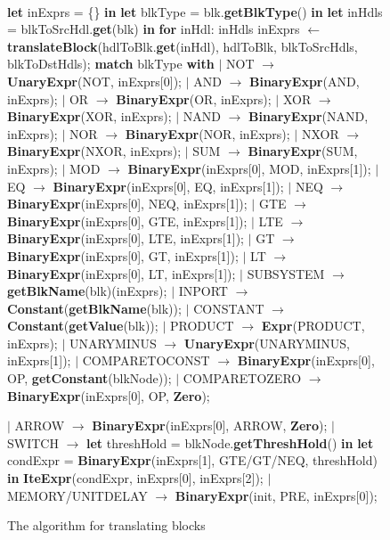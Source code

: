 \documentclass{article}
\begin{document}
\begin{figure}
\begin{algorithmic}
\\
\State \textbf{let} inExprs = \{\} \textbf{in}
\State \textbf{let} blkType = blk.\textbf{getBlkType}() \textbf{in}
\State \textbf{let} inHdls = blkToSrcHdl.\textbf{get}(blk) \textbf{in}
\State \textbf{for} inHdl: inHdls
\State {\ \ \ \ } inExprs $\leftarrow$ \textbf{translateBlock}(hdlToBlk.\textbf{get}(inHdl), hdlToBlk, blkToSrcHdls, blkToDstHdls);
\State \textbf{match} blkType \textbf{with}
\State $\mid$ NOT $\rightarrow$ \textbf{UnaryExpr}(NOT, inExprs[0]);
\State $\mid$ AND $\rightarrow$ \textbf{BinaryExpr}(AND, inExprs);
\State $\mid$ OR $\rightarrow$ \textbf{BinaryExpr}(OR, inExprs);
\State $\mid$ XOR $\rightarrow$ \textbf{BinaryExpr}(XOR, inExprs);
\State $\mid$ NAND $\rightarrow$ \textbf{BinaryExpr}(NAND, inExprs);
\State $\mid$ NOR $\rightarrow$ \textbf{BinaryExpr}(NOR, inExprs);
\State $\mid$ NXOR $\rightarrow$ \textbf{BinaryExpr}(NXOR, inExprs);
\State $\mid$ SUM $\rightarrow$ \textbf{BinaryExpr}(SUM, inExprs);
\State $\mid$ MOD $\rightarrow$ \textbf{BinaryExpr}(inExprs[0], MOD, inExprs[1]);
\State $\mid$ EQ $\rightarrow$ \textbf{BinaryExpr}(inExprs[0], EQ, inExprs[1]);
\State $\mid$ NEQ $\rightarrow$ \textbf{BinaryExpr}(inExprs[0], NEQ, inExprs[1]);
\State $\mid$ GTE $\rightarrow$ \textbf{BinaryExpr}(inExprs[0], GTE, inExprs[1]);
\State $\mid$ LTE $\rightarrow$ \textbf{BinaryExpr}(inExprs[0], LTE, inExprs[1]);
\State $\mid$ GT $\rightarrow$ \textbf{BinaryExpr}(inExprs[0], GT, inExprs[1]);
\State $\mid$ LT $\rightarrow$ \textbf{BinaryExpr}(inExprs[0], LT, inExprs[1]);
\State $\mid$ SUBSYSTEM $\rightarrow$ \textbf{getBlkName}(blk)(inExprs);
\State $\mid$ INPORT $\rightarrow$ \textbf{Constant}(\textbf{getBlkName}(blk));
\State $\mid$ CONSTANT $\rightarrow$ \textbf{Constant}(\textbf{getValue}(blk));
\State $\mid$ PRODUCT $\rightarrow$ \textbf{Expr}(PRODUCT, inExprs);
\State $\mid$ UNARYMINUS $\rightarrow$ \textbf{UnaryExpr}(UNARYMINUS, inExprs[1]);
\State $\mid$ COMPARETOCONST $\rightarrow$ \textbf{BinaryExpr}(inExprs[0], OP, \textbf{getConstant}(blkNode));
\State $\mid$ COMPARETOZERO $\rightarrow$ \textbf{BinaryExpr}(inExprs[0], OP, \textbf{Zero});

\State $\mid$ ARROW $\rightarrow$ \textbf{BinaryExpr}(inExprs[0], ARROW, \textbf{Zero});
\State $\mid$ SWITCH $\rightarrow$  \textbf{let} threshHold = blkNode.\textbf{getThreshHold}() \textbf{in}
\State {\ \ \ \ \ \ \ \ \ \ \ \ \ \ \ \ \ \ } \textbf{let} condExpr = \textbf{BinaryExpr}(inExprs[1], GTE/GT/NEQ, threshHold) \textbf{in}
\State {\ \ \ \ \ \ \ \ \ \ \ \ \ \ \ \ \ \ } \textbf{IteExpr}(condExpr, inExprs[0], inExprs[2]);
\State $\mid$ MEMORY/UNITDELAY $\rightarrow$ \textbf{BinaryExpr}(init, PRE, inExprs[0]);
\EndFunction
\end{algorithmic}
\label{translateblock}
\caption{The algorithm for translating blocks}
\end{figure}
\end{document}
